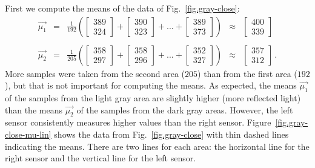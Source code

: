 First we compute the means of the data of Fig.~\ref{fig.gray-close}:
\begin{displaymath}
\begin{array}{ccccc}
\vec{\mu_1} &=& {\displaystyle\frac{1}{192}} \left( \left[ \begin{array}{c} 389\\324 \end{array}\right] + \left[ \begin{array}{c} 390\\323 \end{array}\right] + ... + \left[ \begin{array}{c} 389\\373 \end{array}\right] \right)&\approx&\left[ \begin{array}{c} 400\\339 \end{array}\right]\\
\\
\vec{\mu_2} &=& {\displaystyle\frac{1}{205}} \left( \left[ \begin{array}{c} 358\\297 \end{array}\right] + \left[ \begin{array}{c} 358\\296 \end{array}\right] + ... + \left[ \begin{array}{c} 352\\327 \end{array}\right] \right)&\approx&\left[ \begin{array}{c} 357\\312 \end{array}\right]\,.
\end{array}
\end{displaymath}
More samples were taken from the second area ($205$) than from the first area ($192$), but that is not important for computing the means. As expected, the means $\vec{\mu_1}$ of the samples from the light gray area are slightly higher (more reflected light) than the means $\vec{\mu_2}$ of the samples from the dark gray areas. However, the left sensor consistently measures higher values than the right sensor. Figure~\ref{fig.gray-close-mu-lin} shows the data from Fig.~\ref{fig.gray-close} with thin dashed lines indicating the means. There are two lines for each area: the horizontal line for the right sensor and the vertical line for the left sensor.

